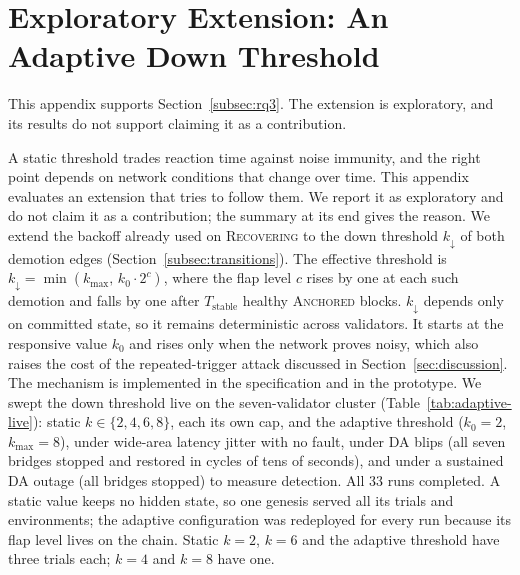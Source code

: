 \section{Exploratory Extension: An Adaptive Down Threshold}
\label{app:adaptive}

This appendix supports Section~\ref{subsec:rq3}. The extension is exploratory, and its results do not support claiming it as a contribution.

A static threshold
trades reaction time against noise immunity, and the right point depends on
network conditions that change over time. This appendix evaluates an
extension that tries to follow them. We report it as exploratory and do not claim
it as a contribution; the summary at its end gives the reason. We extend the backoff already used on
\textsc{Recovering} to the down threshold $k_{\downarrow}$ of both demotion
edges (Section~\ref{subsec:transitions}). The effective threshold is
$k_{\downarrow} = \min(k_{\max},\, k_0 \cdot 2^{c})$, where the flap level $c$
rises by one at each such demotion and falls by one after $T_{\text{stable}}$
healthy \textsc{Anchored} blocks. $k_{\downarrow}$ depends only on committed
state, so it remains deterministic across validators. It starts at the
responsive value $k_0$ and rises only when the network proves noisy, which
also raises the cost of the repeated-trigger attack discussed in
Section~\ref{sec:discussion}. The mechanism is implemented in the
specification and in the prototype.
We swept the down threshold live on the seven-validator cluster
(Table~\ref{tab:adaptive-live}): static $k\in\{2,4,6,8\}$, each its own cap, and
the adaptive threshold ($k_0{=}2$, $k_{\max}{=}8$), under wide-area latency
jitter with no fault, under DA blips (all seven bridges stopped and restored
in cycles of tens of seconds), and under a sustained DA outage (all bridges
stopped) to measure detection. All 33
runs completed. A static value keeps no hidden state, so one genesis served all
its trials and environments; the adaptive configuration was redeployed for every
run because its flap level lives on the chain. Static $k{=}2$, $k{=}6$ and the
adaptive threshold have three trials each; $k{=}4$ and $k{=}8$ have one.

\begin{table}[tbp]
\caption{Live down-edge sweep on seven validators (300\,s runs, mean $\pm$
95\% Student-$t$ interval over the runs, none for a single run; flaps and uptime
averaged over the seven validators of a trial). ``Uptime'' is the share of the
run in \textsc{Anchored}; ``Detection'' is the delay from stopping the bridges of the sustained outage
to the first non-\textsc{Anchored} state on one validator, and ``To
\textsc{Sovereign}'' the delay to \textsc{Sovereign}.}
\label{tab:adaptive-live}
\centering
\footnotesize
\resizebox{\linewidth}{!}{}
\end{table}

